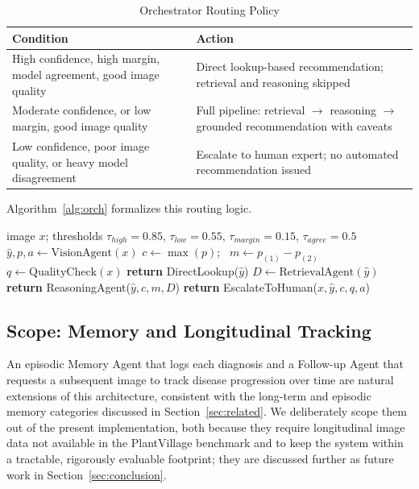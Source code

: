 \documentclass[conference]{IEEEtran}
\begin{document}
\begin{table}[t]
\centering
\caption{Orchestrator Routing Policy}
\label{tab:policy}
\small
\begin{tabular}{p{3.6cm}p{3.6cm}}
\toprule
\textbf{Condition} & \textbf{Action} \\
\midrule
High confidence, high margin, model agreement, good image quality & Direct lookup-based recommendation; retrieval and reasoning skipped \\
Moderate confidence, or low margin, good image quality & Full pipeline: retrieval $\rightarrow$ reasoning $\rightarrow$ grounded recommendation with caveats \\
Low confidence, poor image quality, or heavy model disagreement & Escalate to human expert; no automated recommendation issued \\
\bottomrule
\end{tabular}
\end{table}

Algorithm~\ref{alg:orch} formalizes this routing logic.

\begin{algorithm}[t]
\caption{Orchestrator Routing Policy}
\label{alg:orch}
\begin{algorithmic}[1]
\REQUIRE image $x$; thresholds $\tau_{high}=0.85$, $\tau_{low}=0.55$, $\tau_{margin}=0.15$, $\tau_{agree}=0.5$
\STATE $\hat{y}, p, a \leftarrow \text{VisionAgent}(x)$ 
\STATE $c \leftarrow \max(p)$; \ $m \leftarrow p_{(1)} - p_{(2)}$ 
\STATE $q \leftarrow \text{QualityCheck}(x)$ 
    \STATE \textbf{return} DirectLookup($\hat{y}$) 
    \STATE $D \leftarrow \text{RetrievalAgent}(\hat{y})$
    \STATE \textbf{return} ReasoningAgent($\hat{y}, c, m, D$)
\ELSE
    \STATE \textbf{return} EscalateToHuman($x, \hat{y}, c, q, a$)
\ENDIF
\end{algorithmic}
\end{algorithm}

\subsection{Scope: Memory and Longitudinal Tracking}
An episodic Memory Agent that logs each diagnosis and a Follow-up Agent that requests a subsequent image to track disease progression over time are natural extensions of this architecture, consistent with the long-term and episodic memory categories discussed in Section~\ref{sec:related}. We deliberately scope them out of the present implementation, both because they require longitudinal image data not available in the PlantVillage benchmark and to keep the system within a tractable, rigorously evaluable footprint; they are discussed further as future work in Section~\ref{sec:conclusion}.
\end{document}
